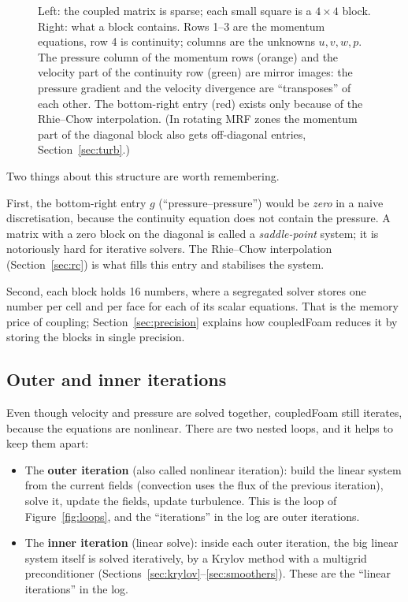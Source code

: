 \documentclass[11pt,a4paper]{article}
\begin{document}
\begin{figure}[tbp]
\caption{Left: the coupled matrix is sparse; each small square is a
$4\times4$ block. Right: what a block contains. Rows 1--3 are the momentum
equations, row 4 is continuity; columns are the unknowns $u,v,w,p$. The
pressure column of the momentum rows (orange) and the velocity part of the
continuity row (green) are mirror images: the pressure gradient and the
velocity divergence are ``transposes'' of each other. The bottom-right entry
(red) exists only because of the Rhie--Chow interpolation. (In rotating MRF
zones the momentum part of the diagonal block also gets off-diagonal
entries, Section~\ref{sec:turb}.)}
\label{fig:block}
\end{figure}

Two things about this structure are worth remembering.

First, the bottom-right entry $g$ (``pressure--pressure'') would be
\emph{zero} in a naive discretisation, because the continuity equation does
not contain the pressure. A matrix with a zero block on the diagonal is
called a \emph{saddle-point} system; it is notoriously hard for iterative
solvers. The Rhie--Chow interpolation (Section~\ref{sec:rc}) is what fills
this entry and stabilises the system.

Second, each block holds 16 numbers, where a segregated solver stores one
number per cell and per face for each of its scalar equations. That is the
memory price of coupling; Section~\ref{sec:precision} explains how
coupledFoam reduces it by storing the blocks in single precision.

\subsection{Outer and inner iterations}

Even though velocity and pressure are solved together, coupledFoam still
iterates, because the equations are nonlinear. There are two nested loops,
and it helps to keep them apart:
\begin{itemize}
\item The \textbf{outer iteration} (also called nonlinear iteration): build
  the linear system from the current fields (convection uses the flux of
  the previous iteration), solve it, update the fields, update turbulence.
  This is the loop of Figure~\ref{fig:loops}, and the ``iterations'' in the
  log are outer iterations.
\item The \textbf{inner iteration} (linear solve): inside each outer
  iteration, the big linear system itself is solved iteratively, by a
  Krylov method with a multigrid preconditioner
  (Sections~\ref{sec:krylov}--\ref{sec:smoothers}). These are the ``linear
  iterations'' in the log.
\end{itemize}
\end{document}
